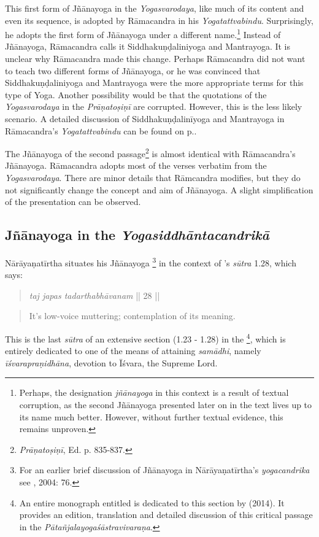 This first form of Jñānayoga in the \textit{Yogasvarodaya}, like much of its content and even its sequence, is adopted by Rāmacandra in his \textit{Yogatattvabindu}. Surprisingly, he adopts the first form of Jñānayoga under a different name.\footnote{Perhaps, the designation \textit{jñānayoga} in this context is a result of textual corruption, as the second Jñānayoga presented later on in the text lives up to its name much better. However, without further textual evidence, this remains unproven.} Instead of Jñānayoga, Rāmacandra calls it Siddhakuṇḍaliniyoga and Mantrayoga. It is unclear why Rāmacandra made this change. Perhaps Rāmacandra did not want to teach two different forms of Jñānayoga, or he was convinced that Siddhakuṇḍaliniyoga and Mantrayoga were the more appropriate terms for this type of Yoga. Another possibility would be that the quotations of the \textit{Yogasvarodaya} in the \textit{Prāṇatoṣiṇī} are corrupted. However, this is the less likely scenario. A detailed discussion of Siddhakuṇḍalinīyoga and Mantrayoga in Rāmacandra's \textit{Yogatattvabindu} can be found on p.\pageref{siddhayogaintro}.

The Jñānayoga of the second passage\footnote{\textit{Prāṇatoṣiṇī}, Ed. p. 835-837.} is almost identical with Rāmacandra's Jñānayoga. Rāmacandra adopts most of the verses verbatim from the \textit{Yogasvarodaya}. There are minor details that Rāmcandra modifies, but they do not significantly change the concept and aim of Jñānayoga. A slight simplification of the presentation can be observed. 

\subsection{Jñānayoga in the \textit{Yogasiddhāntacandrikā}}
\label{jnanayogaintrocandrika}
Nārāyaṇatīrtha situates his Jñānayoga \footnote{For an earlier brief discussion of Jñānayoga in Nārāyaṇatīrtha's \textit{yogacandrika} see \citeauthor{penna2004}, 2004: 76.} in the context of 's \textit{sūtra} 1.28, which says:
\begin{quote} \textit{taj japas tadarthabhāvanam} || 28 || \end{quote}
\begin{quote} It's low-voice muttering; contemplation of its meaning. \end{quote}

This is the last \textit{sūtra} of an extensive section (1.23 - 1.28) in the \footnote{An entire monograph entitled  is dedicated to this section by \citeauthor{harimoto2014} (2014). It provides an edition, translation and detailed discussion of this critical passage in the \textit{Pātañjalayogaśāstravivaraṇa}.}, which is entirely dedicated to one of the means of attaining \textit{samādhi}, namely \textit{īśvarapraṇidhāna}, devotion to Īśvara, the Supreme Lord.

